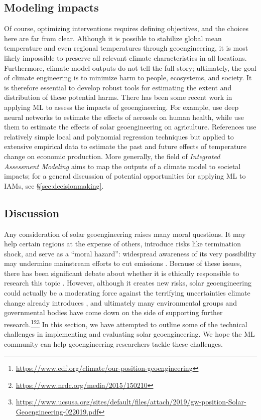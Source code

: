 \documentclass[11pt]{report}
\newcommand{\Gap}{\texorpdfstring{\hfill}{}}
\newcommand{\Longterm}{\texorpdfstring{{\small\emph{\color{OliveGreen}{\fbox{Long-term}}}}}{}}
\begin{document}
\subsection{Modeling impacts \Gap \Longterm}
\label{subsub:impact-models}
Of course, optimizing interventions requires defining objectives, and the choices here are far from clear. Although it is possible to stabilize global mean temperature and even regional temperatures through geoengineering, it is most likely impossible to preserve all relevant climate characteristics in all locations. Furthermore, climate model outputs do not tell the full story; ultimately, the goal of climate engineering is to minimize harm to people, ecosystems, and society. It is therefore essential to develop robust tools for estimating the extent and distribution of these potential harms.  There has been some recent work in applying ML to assess the impacts of geoengineering. For example, \cite{di2016assessing} use deep neural networks to estimate the effects of aerosols on human health, while \cite{crane2018using} use them to estimate the effects of solar geoengineering on agriculture. References \cite{burke2015global,diffenbaugh2019global} use relatively simple local and polynomial regression techniques but applied to extensive empirical data to estimate the past and future effects of temperature change on economic production. More generally, the field of \emph{Integrated Assessment Modeling}  \cite{kelly1999integrated,weyant2017some} aims to map the outputs of a climate model to societal impacts; for a general discussion of potential opportunities for applying ML to IAMs, see \S\ref{sec:decisionmaking}.

\subsection{Discussion}

Any consideration of solar geoengineering raises many moral questions. 
It may help certain regions at the expense of others, introduce risks like termination shock, and serve as a ``moral hazard'': widespread awareness of its very possibility may undermine mainstream efforts to cut emissions \cite{lin2013does}. Because of these issues, there has been significant debate about whether it is ethically responsible to research this topic \cite{preston2013ethics,keith2017toward}. However, although it creates new risks, solar geoengineering could actually be a moderating force against the terrifying uncertainties climate change already introduces \cite{macmartin2015solar,irvine2019halving}, and ultimately many environmental groups and governmental bodies have come down on the side of supporting further research.\footnote{ \url{https://www.edf.org/climate/our-position-geoengineering}}\footnote{\url{https://www.nrdc.org/media/2015/150210}}\footnote{\url{https://www.ucsusa.org/sites/default/files/attach/2019/gw-position-Solar-Geoengineering-022019.pdf}}
In this section, we have attempted to outline some of the technical challenges in implementing and evaluating solar geoengineering. We hope the ML community can help geoengineering researchers tackle these challenges.
\end{document}
